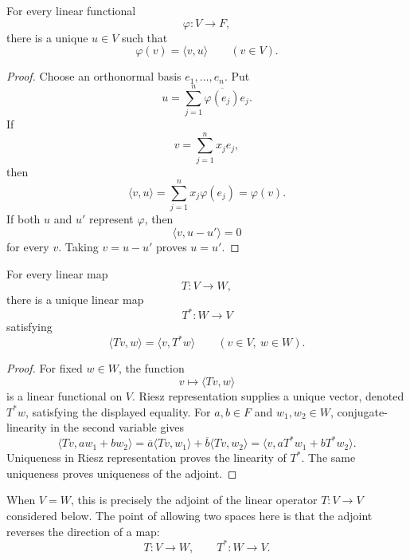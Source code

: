 \begin{theorem}
For every linear functional
\[
\varphi:V\longrightarrow F,
\]
there is a unique \(u\in V\) such that
\[
\varphi(v)=\langle v,u\rangle
\qquad(v\in V).
\]
\end{theorem}
\begin{proof}
Choose an orthonormal basis \(e_1,\ldots,e_n\). Put
\[
u=\sum_{j=1}^n\overline{\varphi(e_j)}e_j.
\]
If
\[
v=\sum_{j=1}^nx_je_j,
\]
then
\[
\langle v,u\rangle
=\sum_{j=1}^nx_j\varphi(e_j)
=\varphi(v).
\]
If both \(u\) and \(u'\) represent \(\varphi\), then
\[
\langle v,u-u'\rangle=0
\]
for every \(v\). Taking \(v=u-u'\) proves \(u=u'\).
\end{proof}

\begin{theorem}[Adjoint]
For every linear map
\[
T:V\longrightarrow W,
\]
there is a unique linear map
\[
T^*:W\longrightarrow V
\]
satisfying
\[
\langle Tv,w\rangle=\langle v,T^*w\rangle
\qquad(v\in V,\ w\in W).
\]
\end{theorem}
\begin{proof}
For fixed \(w\in W\), the function
\[
v\longmapsto\langle Tv,w\rangle
\]
is a linear functional on \(V\). Riesz representation supplies a unique
vector, denoted \(T^*w\), satisfying the displayed equality. For
\(a,b\in F\) and \(w_1,w_2\in W\), conjugate-linearity in the second
variable gives
\[
\langle Tv,aw_1+bw_2\rangle
=\overline a\langle Tv,w_1\rangle
+\overline b\langle Tv,w_2\rangle
=\langle v,aT^*w_1+bT^*w_2\rangle.
\]
Uniqueness in Riesz representation proves the linearity of \(T^*\). The
same uniqueness proves uniqueness of the adjoint.
\end{proof}

\noindent When \(V=W\), this is precisely the adjoint of the linear operator
\(T:V\to V\) considered below.  The point of allowing two spaces here is
that the adjoint reverses the direction of a map:
\[
T:V\longrightarrow W,
\qquad
T^*:W\longrightarrow V.
\]

